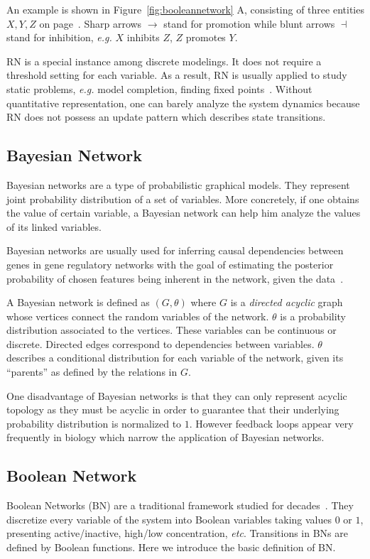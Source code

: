 An example is shown in Figure~\ref{fig:booleannetwork} A, consisting of three entities $X,Y,Z$ on page~\pageref{fig:booleannetwork}.
Sharp arrows $\to$ stand for promotion while blunt arrows $\dashv$ stand for inhibition,
\textit{e.g.} $X$ inhibits $Z$, $Z$ promotes $Y$.

RN is a special instance among discrete modelings.
It does not require a threshold setting for each variable.
As a result, RN is usually applied to study static problems, \textit{e.g.} model completion, finding fixed points~\cite{yamamoto2014completing}.
Without quantitative representation, one can barely analyze the system dynamics because RN does not possess an update pattern which describes state transitions.

\subsection{Bayesian Network}
Bayesian networks are a type of probabilistic graphical models. 
They represent joint probability distribution of a set of variables.
More concretely, if one obtains the value of certain variable, a Bayesian network can help him analyze the values of its linked variables.

Bayesian networks are usually used for inferring causal dependencies between genes in gene regulatory networks with the goal of estimating the posterior probability of chosen features being inherent in the network, given the data~\cite{friedman2000using}.

A Bayesian network is defined as $(G, \theta)$ where $G$ is a \textit{directed acyclic} graph whose vertices connect the random variables of the network.
$\theta$ is a probability distribution associated to the vertices. 
These variables can be continuous or discrete. 
Directed edges correspond to dependencies between variables. 
$\theta$ describes a conditional distribution for each variable of the network, given its ``parents'' as defined by the relations in $G$.

One disadvantage of Bayesian networks is that they can only represent acyclic topology as they must be acyclic in order to guarantee that their underlying probability distribution is normalized to $1$.
However feedback loops appear very frequently in biology which narrow the application of Bayesian networks.

\subsection{Boolean Network}
Boolean Networks (BN) are a traditional framework studied for decades~\cite{kauffman1969}.
They discretize every variable of the system into Boolean variables taking values $0$ or $1$, presenting active/inactive, high/low concentration, \textit{etc}. 
Transitions in BNs are defined by Boolean functions.
Here we introduce the basic definition of BN.

